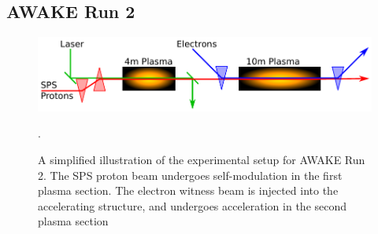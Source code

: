 \documentclass[aps,prstab,reprint,amsmath,amssymb,groupedaddress]{revtex4-1}
\begin{document}


\subsection{AWAKE Run 2}\label{S:I:AWAKE}

\begin{figure}[hbt]
    \includegraphics[width=0.99\linewidth,trim={1mm 2mm 1mm 2mm},clip]{figures/figAWAKE}
    \caption{\label{Fig:AWAKER2} A simplified illustration of the experimental setup for AWAKE Run 2. The SPS proton
        beam undergoes self-modulation in the first plasma section. The electron witness beam is injected into the
        accelerating structure, and undergoes acceleration in the second plasma section
        \cite{berglyd_olsen:2015, adli:2016}}.
\end{figure}
\end{document}
